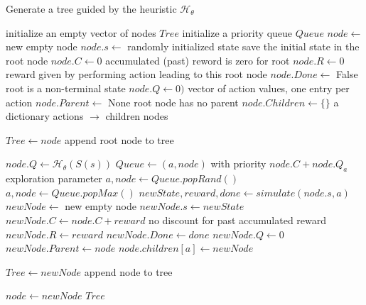 \documentclass{article}
\begin{document}
\begin{algorithm}[h]
  \caption{Generate a tree guided by the heuristic ${\mathcal H}_\theta$}
  \label{alg:gentree}
  \begin{algorithmic}[1]
    \State initialize an empty vector of nodes $\mathit{Tree}$
    \State initialize a priority queue $\mathit{Queue}$
    \State $\mathit{node} \leftarrow$ new empty node
    \State $\mathit{node.s} \leftarrow$ randomly initialized state
    \Comment save the initial state in the root node
    \State $\mathit{node.C} \leftarrow 0$
    \Comment accumulated (past) reword is zero for root
    \State $\mathit{node.R} \leftarrow 0$
    \Comment reward given by performing action leading to this root node
    \State $\mathit{node.Done} \leftarrow$ False
    \Comment root is a non-terminal state
    \State $\mathit{node.Q} \leftarrow 0)$
  \Comment vector of action values, one entry per action  
  \State $\mathit{node.Parent} \leftarrow$ None
  \Comment root node has no parent
  \State $\mathit{node.Children} \leftarrow \{ \}$
  \Comment a dictionary actions $\rightarrow$ children nodes
  
  \State $\mathit{Tree} \leftarrow \mathit{node}$
  \Comment append root node to tree
  
  \Repeat
  \State $\mathit{node.Q} \leftarrow {\mathcal H}_\theta(S(s))$
  \State $\mathit{Queue} \leftarrow (a, \mathit{node})$ with priority $\mathit{node.C+\mathit{node.Q_a}}$
  \EndFor
    \EndIf
      \Comment exploration parameter
      \State $a, node \leftarrow \mathit{Queue.popRand()}$
    \Else
      \State $a, node \leftarrow \mathit{Queue.popMax()}$
    \EndIf
    \State $\mathit{newState, reward, done} \leftarrow \mathit{simulate(node.s, a)}$
    \State $\mathit{newNode} \leftarrow$ new empty node
    \State $\mathit{newNode.s} \leftarrow \mathit{newState}$
    \State $\mathit{newNode.C} \leftarrow \mathit{node.C + reward}$
    \Comment no discount for past accumulated reward
    \State $\mathit{newNode.R} \leftarrow \mathit{reward}$
    \State $\mathit{newNode.Done} \leftarrow \mathit{done}$
    \State $\mathit{newNode.Q} \leftarrow 0$
    \State $\mathit{newNode.Parent} \leftarrow \mathit{node}$
    \State $\mathit{node.children[a]} \leftarrow \mathit{newNode}$

    \State $\mathit{Tree} \leftarrow \mathit{newNode}$
    \Comment append node to tree    

    \State $\mathit{node} \leftarrow \mathit{newNode}$
   $\mathit{Tree}$
\end{algorithmic}
\end{algorithm}
\end{document}
